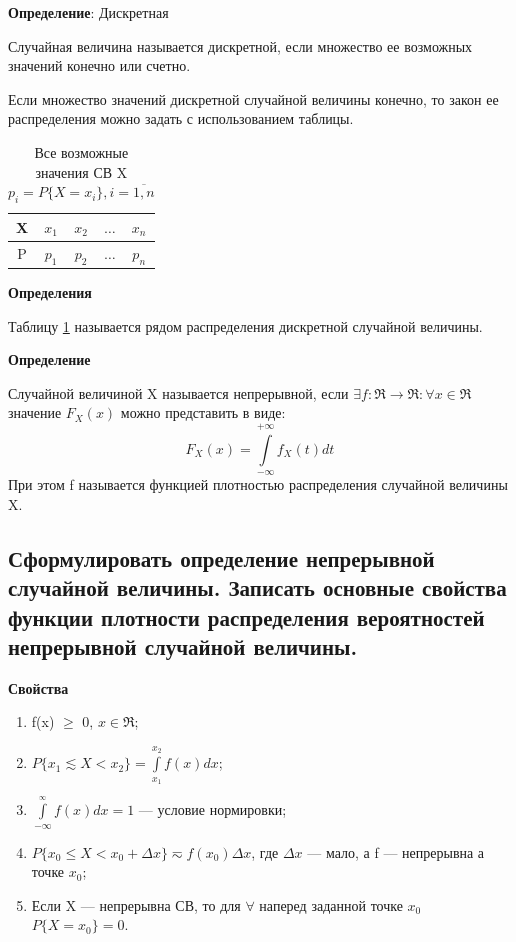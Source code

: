\textbf{Определение}: Дискретная

Случайная величина называется дискретной, если множество ее возможных значений конечно или счетно.

Если множество значений дискретной случайной величины конечно, то закон ее распределения можно задать с использованием таблицы.
\newpage
\begin{table}[ht!]
	\begin{center}
		\caption{Все возможные значения СВ X $p_i = P\{X=x_i\}, i = \overline{1,n}$}
		\label{tbl:best}
		\begin{tabular}{|c|c|c|c|c|}
			\hline
			X & $x_1$ & $x_2$ & $\dots$ & $x_n$ \\ 
			\hline
			P & $p_1$ & $p_2$ & $\dots$ & $p_n$ \\
			\hline
		\end{tabular}
	\end{center}
\end{table}



\textbf{Определения}

Таблицу \ref{tbl:best} называется рядом распределения дискретной случайной величины.

\textbf{Определение}

Случайной величиной X называется непрерывной, если $\exists f: \Re \rightarrow \Re: \forall x \in \Re$ значение $F_X(x)$ можно представить в виде:
\begin{equation}
	F_X(x) = \int\limits_{-\infty}^{+\infty} f_X(t)dt
\end{equation}
При этом f называется функцией плотностью распределения случайной величины X.

\subsection{Сформулировать определение непрерывной случайной величины. Записать основные свойства функции плотности распределения вероятностей непрерывной случайной величины.}

\textbf{Свойства}

\begin{enumerate}[label=\arabic*.]
	\item f(x) $\geq$ 0, $x \in \Re$;
	\item $P\{x_1 \lesssim X < x_2\} = \int\limits_{x_1}^{x_2}f(x)dx$;
	\item $\int\limits_{-\infty}^{_\infty}f(x)dx = 1$ --- условие нормировки;
	\item $P\{x_0 \leq X < x_0 + \Delta x\} \eqsim f(x_0)\Delta x$, где $\Delta x$ --- мало, а f --- непрерывна а точке $x_0$;
	\item Если X --- непрерывна СВ, то для $\forall$ наперед заданной точке $x_0$ $P\{X=x_0\}=0$.
\end{enumerate}


